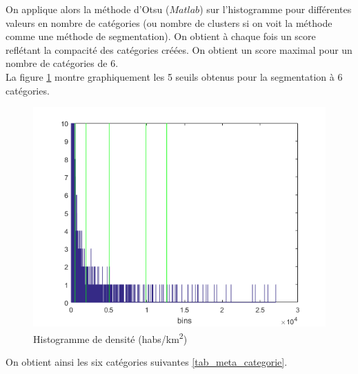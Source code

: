 \documentclass{book}
\begin{document}
On applique alors la méthode d'Otsu ($Matlab$) sur l'histogramme pour différentes valeurs en nombre de catégories (ou nombre de clusters si on voit la méthode comme
une méthode de segmentation). On obtient à chaque fois un score reflétant la compacité des catégories créées. On obtient un score maximal pour un nombre de catégories de 6.\\
La figure \ref{densite_histo_otsu} montre graphiquement les 5 seuils obtenus pour la segmentation  à 6 catégories.

\begin{figure}[H]
\begin{center}
  \includegraphics[scale=0.7]{images/labels/densite_histo_otsu_zoom.png}
\end{center}
\caption{Histogramme de densité (habs/km\textsuperscript{2})}
\label{densite_histo_otsu}
\end{figure}

On obtient ainsi les six catégories suivantes \ref{tab_meta_categorie}.
\end{document}
